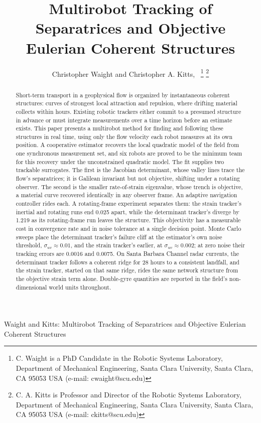\documentclass[lettersize,journal]{IEEEtran}
\begin{document}
\title{Multirobot Tracking of Separatrices and
Objective Eulerian Coherent Structures}

\author{Christopher Waight and Christopher A. Kitts,~
\thanks{C. Waight is a PhD Candidate in the Robotic Systems Laboratory, Department of Mechanical Engineering, Santa Clara University, Santa Clara, CA 95053 USA (e-mail: cwaight@scu.edu)}
\thanks{C. A. Kitts is Professor and Director of the Robotic Systems Laboratory, Department of Mechanical Engineering, Santa Clara University, Santa Clara, CA 95053 USA (e-mail: ckitts@scu.edu)}
}
%
{Waight and Kitts: Multirobot Tracking of Separatrices and Objective Eulerian Coherent Structures}

\maketitle

\begin{abstract}
Short-term transport in a geophysical flow is organized by
instantaneous coherent structures: curves of strongest local attraction
and repulsion, where drifting material collects within hours. Existing
robotic trackers either commit to a presumed structure in advance or
must integrate measurements over a time horizon before an estimate
exists. This paper presents a multirobot method for finding and
following these structures in real time, using only the flow velocity
each robot measures at its own position. A cooperative estimator
recovers the local quadratic model of the field from one synchronous
measurement set, and six robots are proved to be the minimum team for
this recovery under the unconstrained quadratic model. The fit supplies two trackable surrogates. The first is the Jacobian
determinant, whose valley lines trace the flow's separatrices; it is
Galilean invariant but not objective, shifting under a rotating observer.
The second is the smaller rate-of-strain eigenvalue, whose trench is
objective, a material curve recovered identically in any observer frame.
An adaptive navigation controller rides each. A rotating-frame experiment
separates them: the strain tracker's inertial and rotating runs end
0.025 apart, while the determinant tracker's diverge by 1.219 as its
rotating-frame run leaves the structure. This objectivity has a
measurable cost in convergence rate and in noise tolerance at a single
decision point. Monte Carlo sweeps place the determinant
tracker's failure cliff at the estimator's own noise threshold,
$\sigma_{uv} \approx 0.01$, and the strain tracker's earlier, at
$\sigma_{uv} \approx 0.002$; at zero noise their tracking errors are
0.0016 and 0.0075. On Santa Barbara Channel radar currents, the
determinant tracker follows a coherent ridge for 28 hours to a consistent
landfall, and the strain tracker, started on that same ridge, rides the
same network structure from the objective strain term alone. Double-gyre
quantities are reported in the field's non-dimensional world units
throughout.
\end{abstract}
\end{document}
